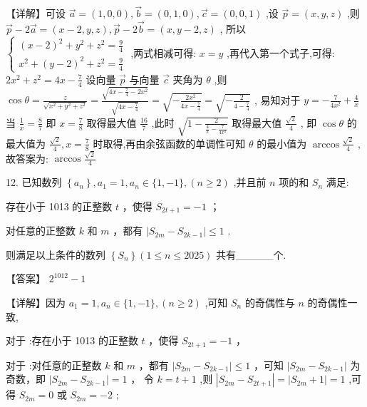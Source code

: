 \documentclass[10pt]{article}
\newcommand*\circled[1]{\tikz[baseline=(char.base)]{\node[shape=circle,draw,inner sep=1.5pt] (char) {\small #1};}}
\begin{document}
【详解】可设 \(\overrightarrow{a} = \left( {1,0,0}\right) ,\overrightarrow{b} = \left( {0,1,0}\right) ,\overrightarrow{c} = \left( {0,0,1}\right)\) ,设 \(\overrightarrow{p} = \left( {x,y,z}\right)\) ,则 \(\overrightarrow{p} - 2\overrightarrow{a} = \left( {x - 2,y,z}\right) ,\overrightarrow{p} - 2\overrightarrow{b} = \left( {x,y - 2,z}\right)\) , 所以 \(\left\{  \begin{array}{l} {\left( x - 2\right) }^{2} + {y}^{2} + {z}^{2} = \frac{9}{4} \\  {x}^{2} + {\left( y - 2\right) }^{2} + {z}^{2} = \frac{9}{4} \end{array}\right.\) ,两式相减可得: \(x = y\) ,再代入第一个式子,可得: \(2{x}^{2} + {z}^{2} = {4x} - \frac{7}{4}\) 设向量 \(\overrightarrow{p}\) 与向量 \(\overrightarrow{c}\) 夹角为 \(\theta\) ,则 \(\cos \theta  = \frac{z}{\sqrt{{x}^{2} + {y}^{2} + {z}^{2}}} = \frac{\sqrt{{4x} - \frac{7}{4} - 2{x}^{2}}}{\sqrt{{4x} - \frac{7}{4}}} = \sqrt{-\frac{2{x}^{2}}{{4x} - \frac{7}{4}}} = \sqrt{-\frac{2}{4 - \frac{7}{4}}}\) , 易知对于 \(y =  - \frac{7}{4{x}^{2}} + \frac{4}{x}\) 当 \(\frac{1}{x} = \frac{8}{7}\) 即 \(x = \frac{7}{8}\) 取得最大值 \(\frac{16}{7}\) ,此时 \(\sqrt{1 - \frac{2}{\frac{4}{x} - \frac{7}{4{x}^{2}}}}\) 取得最大值 \(\frac{\sqrt{2}}{4}\) , 即 \(\cos \theta\) 的最大值为 \(\frac{\sqrt{2}}{4},x = \frac{7}{8}\) 时取得,再由余弦函数的单调性可知 \(\theta\) 的最小值为 \(\arccos \frac{\sqrt{2}}{4}\) , 故答案为: \(\arccos \frac{\sqrt{2}}{4}\)

12. 已知数列 \(\left\{  {a}_{n}\right\}  ,{a}_{1} = 1,{a}_{n} \in  \{ 1, - 1\} ,\left( {n \geq  2}\right)\) ,并且前 \(n\) 项的和 \({S}_{n}\) 满足:

 \circled{1} 存在小于 1013 的正整数 \(t\) ，使得 \({S}_{{2t} + 1} =  - 1\) ；

 \circled{2} 对任意的正整数 \(k\) 和 \(m\) ，都有 \(\left| {{S}_{2m} - {S}_{{2k} - 1}}\right|  \leq  1\) .

则满足以上条件的数列 \(\left\{  {S}_{n}\right\}  \left( {1 \leq  n \leq  {2025}}\right)\) 共有\_\_\_\_\_个.

【答案】 \({2}^{1012} - 1\)

【详解】因为 \({a}_{1} = 1,{a}_{n} \in  \{ 1, - 1\} ,\left( {n \geq  2}\right)\) ,可知 \({S}_{n}\) 的奇偶性与 \(n\) 的奇偶性一致,

对于 \circled{1} :存在小于 1013 的正整数 \(t\) ，使得 \({S}_{{2t} + 1} =  - 1\) ，

对于 \circled{2} :对任意的正整数 \(k\) 和 \(m\) ，都有 \(\left| {{S}_{2m} - {S}_{{2k} - 1}}\right|  \leq  1\) ，可知 \(\left| {{S}_{2m} - {S}_{{2k} - 1}}\right|\) 为奇数，即 \(\left| {{S}_{2m} - {S}_{{2k} - 1}}\right|  = 1\) ， 令 \(k = t + 1\) ,则 \(\left| {{S}_{2m} - {S}_{{2t} + 1}}\right|  = \left| {{S}_{2m} + 1}\right|  = 1\) ,可得 \({S}_{2m} = 0\) 或 \({S}_{2m} =  - 2\) ;
\end{document}
